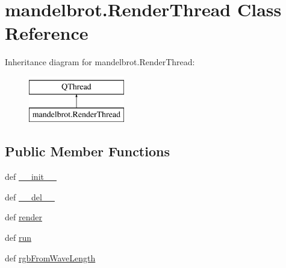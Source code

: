 \hypertarget{classmandelbrot_1_1RenderThread}{}\section{mandelbrot.\+Render\+Thread Class Reference}
\label{classmandelbrot_1_1RenderThread}
Inheritance diagram for mandelbrot.\+Render\+Thread\+:\begin{figure}[H]
\begin{center}
\leavevmode
\includegraphics[height=2.000000cm]{classmandelbrot_1_1RenderThread}
\end{center}
\end{figure}
\subsection*{Public Member Functions}
\begin{DoxyCompactItemize}
\item 
def \hyperlink{classmandelbrot_1_1RenderThread_a91cb8115c27d80df34f304032ca53467}{\+\_\+\+\_\+init\+\_\+\+\_\+}
\item 
def \hyperlink{classmandelbrot_1_1RenderThread_a5571f4792aa7fe57e8e915061140ac53}{\+\_\+\+\_\+del\+\_\+\+\_\+}
\item 
def \hyperlink{classmandelbrot_1_1RenderThread_a6cfde09e516d5e7725336bdffbf42355}{render}
\item 
def \hyperlink{classmandelbrot_1_1RenderThread_a6ca3a5b9c28329e8f7b52a09d060ffa0}{run}
\item 
def \hyperlink{classmandelbrot_1_1RenderThread_a2127758f3e5d75a467dbdc5bc95bc115}{rgb\+From\+Wave\+Length}
\end{DoxyCompactItemize}
